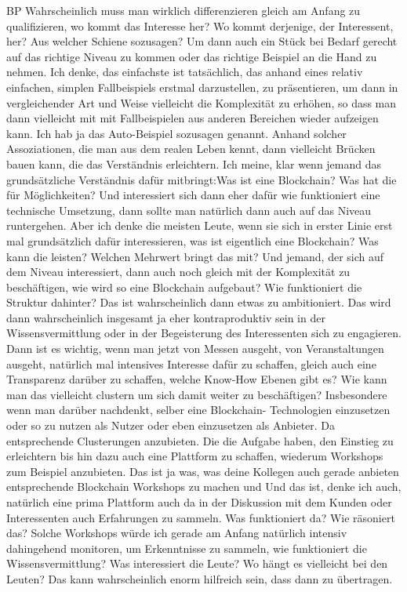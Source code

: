 \begin{xlist}
    \item[BP]Wahrscheinlich muss man wirklich differenzieren gleich am Anfang zu qualifizieren, wo kommt das Interesse her? Wo kommt derjenige, der Interessent, her? Aus welcher Schiene sozusagen? Um dann auch ein Stück bei Bedarf gerecht auf das richtige Niveau zu kommen oder das richtige Beispiel an die Hand zu nehmen. Ich denke, das einfachste ist tatsächlich, das anhand eines relativ einfachen, simplen Fallbeispiels erstmal darzustellen, zu präsentieren, um dann in vergleichender Art und Weise vielleicht die Komplexität zu erhöhen, so dass man dann vielleicht mit mit Fallbeispielen aus anderen Bereichen wieder aufzeigen kann. Ich hab ja das Auto-Beispiel sozusagen genannt. Anhand solcher Assoziationen, die man aus dem realen Leben kennt, dann vielleicht Brücken bauen kann, die das Verständnis erleichtern. Ich meine, klar wenn jemand das grundsätzliche Verständnis dafür mitbringt:Was ist eine Blockchain? Was hat die für Möglichkeiten? Und interessiert sich dann eher dafür wie funktioniert eine technische Umsetzung, dann sollte man natürlich dann auch auf das Niveau runtergehen. Aber ich denke die meisten Leute, wenn sie sich in erster Linie erst mal grundsätzlich dafür interessieren, was ist eigentlich eine Blockchain? Was kann die leisten? Welchen Mehrwert bringt das mit? Und jemand, der sich auf dem Niveau interessiert, dann auch noch gleich mit der Komplexität zu beschäftigen, wie wird so eine Blockchain aufgebaut? Wie funktioniert die Struktur dahinter? Das ist wahrscheinlich dann etwas zu ambitioniert. Das wird dann wahrscheinlich insgesamt ja eher kontraproduktiv sein in der Wissensvermittlung oder in der Begeisterung des Interessenten sich zu engagieren. Dann ist es wichtig, wenn man jetzt von Messen ausgeht, von Veranstaltungen ausgeht, natürlich mal intensives Interesse dafür zu schaffen, gleich auch eine Transparenz darüber zu schaffen, welche Know-How Ebenen gibt es? Wie kann man das vielleicht clustern um sich damit weiter zu beschäftigen? Insbesondere wenn man darüber nachdenkt, selber eine Blockchain- Technologien einzusetzen oder so zu nutzen als Nutzer oder eben einzusetzen als Anbieter. Da entsprechende Clusterungen anzubieten. Die die Aufgabe haben, den Einstieg zu erleichtern bis hin dazu auch eine Plattform zu schaffen, wiederum Workshops zum Beispiel anzubieten. Das ist ja was, was deine Kollegen auch gerade anbieten entsprechende Blockchain Workshops zu machen und Und das ist, denke ich auch, natürlich eine prima Plattform auch da in der Diskussion mit dem Kunden oder Interessenten auch Erfahrungen zu sammeln. Was funktioniert da? Wie räsoniert das? Solche Workshops würde ich gerade am Anfang natürlich intensiv dahingehend monitoren, um Erkenntnisse zu sammeln, wie funktioniert die Wissensvermittlung? Was interessiert die Leute? Wo hängt es vielleicht bei den Leuten? Das kann wahrscheinlich enorm hilfreich sein, dass dann zu übertragen.

\end{xlist}
